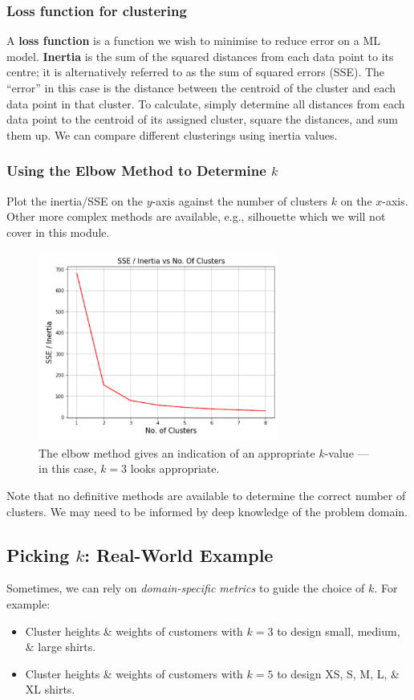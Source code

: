 \documentclass[a4paper,11pt]{article}
\begin{document}
\subsubsection{Loss function for clustering}
A \textbf{loss function} is a function we wish to minimise to reduce error on a ML model.
\textbf{Inertia} is the sum of the squared distances from each data point to its centre; it is alternatively referred to as the sum of squared errors (SSE).
The ``error'' in this case is the distance between the centroid of the cluster and each data point in that cluster.
To calculate, simply determine all distances from each data point to the centroid of its assigned cluster, square the distances, and sum them up.
We can compare different clusterings using inertia values.

\subsubsection{Using the Elbow Method to Determine $k$}
Plot the inertia/SSE on the $y$-axis against the number of clusters $k$ on the $x$-axis.
Other more complex methods are available, e.g., silhouette which we will not cover in this module.
\begin{figure}[H]
    \centering
    \includegraphics[width=0.7\textwidth]{images/elbowmethod.png}
    \caption{ The elbow method gives an indication of an appropriate $k$-value — in this case, $k=3$ looks appropriate.}
\end{figure}

Note that no definitive methods are available to determine the correct number of clusters.
We may need to be informed by deep knowledge of the problem domain.

\subsection{Picking $k$: Real-World Example}
Sometimes, we can rely on \textit{domain-specific metrics} to guide the choice of $k$.
For example:
\begin{itemize}
    \item   Cluster heights \& weights of customers with $k = 3$ to design small, medium, \& large shirts.
    \item   Cluster heights \& weights of customers with $k = 5$ to design XS, S, M, L, \& XL shirts.
\end{itemize}
\end{document}
